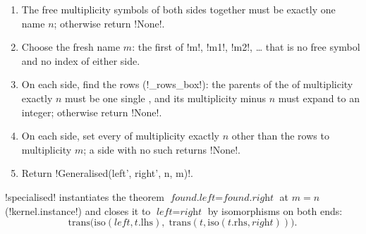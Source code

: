 \begin{algorithm}\label{alg:semantics-generalise-columns}
\begin{enumerate}
\item The free multiplicity symbols of both sides together must be exactly one name $n$; otherwise return \py!None!.
\item Choose the fresh name $m$: the first of \code!m!, \code!m1!, \code!m2!, \ldots{} that is no free symbol and no \bbox{} index of either side.
\item On each side, find the rows \bbox{} (\py!_rows_box!): the parents of the \bboxes{} of multiplicity exactly $n$ must be one single \bbox{}, and its multiplicity minus $n$ must expand to an integer; otherwise return \py!None!.
\item On each side, set every \bbox{} of multiplicity exactly $n$ other than the rows \bbox{} to multiplicity $m$; a side with no such \bbox{} returns \py!None!.
\item Return \py!Generalised(left', right', n, m)!.
\end{enumerate}
\end{algorithm}

\py!specialised! instantiates the theorem $\textit{found.left}=\textit{found.right}$ at $m=n$ (\py!kernel.instance!) and closes it to $\textit{left}=\textit{right}$ by isomorphisms on both ends:
\[
\mathrm{trans}\bigl(\mathrm{iso}(\textit{left},t.\mathrm{lhs}),\;\mathrm{trans}(t,\mathrm{iso}(t.\mathrm{rhs},\textit{right}))\bigr).
\]

